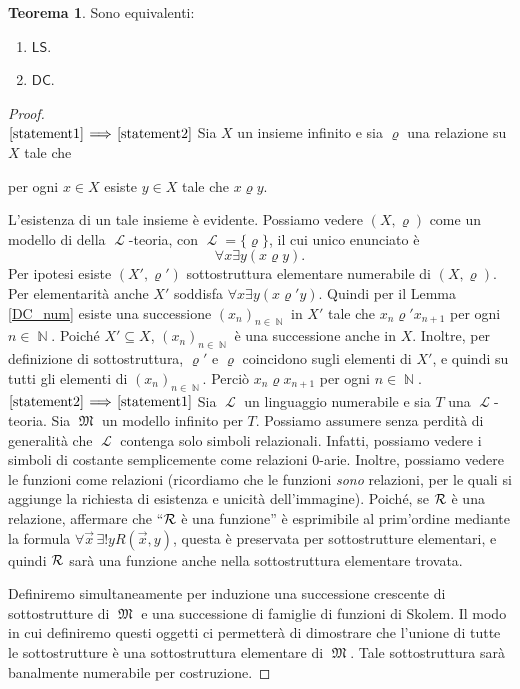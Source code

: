 \documentclass[12pt,a4paper]{report}
\theoremstyle{definition}
\newtheorem{teo}{Teorema}[section]  %
\theoremstyle{num.custom-title}
\DeclareMathOperator{\LL}{\mathcal{L}}
\DeclareMathOperator{\N}{\mathbb{N}}
\DeclareMathOperator{\M}{\mathfrak{M}}
\DeclareMathOperator{\sse}{\subseteq}
\newcommand{\DC}{\ensuremath{\mathsf{DC}}\xspace}
\newcommand{\LS}{\ensuremath{\mathsf{LS}}\xspace}
\newcommand{\Implies}[2]{$\text{\ref{statement#1}}\!\implies\!\text{\ref{statement#2}}$}%
\newcommand{\punto}[1]{\item \label{statement#1}}
\newenvironment{equivalence}
    {\begin{enumerate}[label=(\arabic*),ref=(\arabic*)]
    }
    { 
	\end{enumerate}
    }
\begin{document}
\begin{teo} Sono equivalenti:
\begin{equivalence}
\punto{1} \LS.
\punto{2} \DC.
\end{equivalence}
\begin{proof}\ \\
\Implies{1}{2} Sia $X$ un insieme infinito e sia $\varrho$ una relazione su $X$ tale che 
\begin{center}
per ogni $x \in X$ esiste $y \in X$ tale che $x \varrho y$.
\end{center}
L'esistenza di un tale insieme è evidente. Possiamo vedere $(X,\varrho)$ come un modello di della $\LL$-teoria, con $\LL=\{\varrho\}$, il cui unico enunciato è 
\[
\forall x \exists y (x \varrho y).
\]
Per ipotesi esiste $(X',\varrho')$ sottostruttura elementare numerabile di $(X,\varrho)$. Per elementarità anche $X'$ soddisfa $\forall x \exists y (x \varrho' y)$. Quindi per il Lemma \ref{DC_num} esiste una successione $(x_n)_{n \in \N}$ in $X'$ tale che $x_n \varrho' x_{n+1}$ per ogni $n \in \N$. Poiché $X' \sse X$, $(x_n)_{n \in \N}$ è una successione anche in $X$. Inoltre, per definizione di sottostruttura, $\varrho'$ e $\varrho$ coincidono sugli elementi di $X'$, e quindi su tutti gli elementi di $(x_n)_{n \in \N}$. Perciò $x_n \varrho x_{n+1}$ per ogni $n \in \N$.\\
\Implies{2}{1} Sia $\LL$ un linguaggio numerabile e sia $T$ una $\LL$-teoria. Sia $\M$ un modello infinito per $T$. Possiamo assumere senza perdità di generalità che $\LL$ contenga solo simboli relazionali. Infatti, possiamo vedere i simboli di costante semplicemente come relazioni $0$-arie. Inoltre, possiamo vedere le funzioni come relazioni (ricordiamo che le funzioni \emph{sono} relazioni, per le quali si aggiunge la richiesta di esistenza e unicità dell'immagine). Poiché, se $\cal R$ è una relazione, affermare che ``$\cal R$ è una funzione'' è esprimibile al prim'ordine mediante la formula $\forall \vec x \, \exists ! y R(\vec x, y)$, questa è preservata per sottostrutture elementari, e quindi $\cal R$ sarà una funzione anche nella sottostruttura elementare trovata.

Definiremo simultaneamente per induzione una successione crescente di sottostrutture di $\M$ e una successione di famiglie di funzioni di Skolem. Il modo in cui definiremo questi oggetti ci permetterà di dimostrare che l'unione di tutte le sottostrutture è una sottostruttura elementare di $\M$. Tale sottostruttura sarà banalmente numerabile per costruzione.


\end{proof}
\end{teo}
\end{document}
